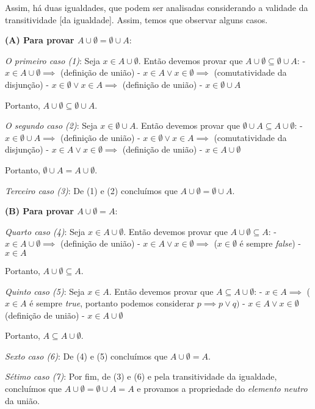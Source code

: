 \documentclass{article}
\begin{document}
Assim, há duas igualdades, que podem ser analisadas considerando a
validade da transitividade {[}da igualdade{]}. Assim, temos que observar
alguns casos.

\textbf{(A) Para provar \(A \cup \emptyset = \emptyset \cup A\)}:

\emph{O primeiro caso (1)}: Seja \(x \in A \cup \emptyset\). Então
devemos provar que \(A \cup \emptyset \subseteq \emptyset \cup A\): -
\(x \in A \cup \emptyset \implies\) (definição de união) -
\(x \in A \lor x \in \emptyset \implies\) (comutatividade da disjunção)
- \(x \in \emptyset \lor x \in A \implies\) (definição de união) -
\(x \in \emptyset \cup A\)

Portanto, \(A \cup \emptyset \subseteq \emptyset \cup A\).

\emph{O segundo caso (2)}: Seja \(x \in \emptyset \cup A\). Então
devemos provar que \(\emptyset \cup A \subseteq A \cup \emptyset\): -
\(x \in \emptyset \cup A \implies\) (definição de união) -
\(x \in \emptyset \lor x \in A \implies\) (comutatividade da disjunção)
- \(x \in A \lor x \in \emptyset \implies\) (definição de união) -
\(x \in A \cup \emptyset\)

Portanto, \(\emptyset \cup A = A \cup \emptyset\).

\emph{Terceiro caso (3)}: De (1) e (2) concluímos que
\(A \cup \emptyset = \emptyset \cup A\).

\textbf{(B) Para provar \(A \cup \emptyset = A\)}:

\emph{Quarto caso (4)}: Seja \(x \in A \cup \emptyset\). Então devemos
provar que \(A \cup \emptyset \subseteq A\): -
\(x \in A \cup \emptyset \implies\) (definição de união) -
\(x \in A \lor x \in \emptyset \implies\) (\(x \in \emptyset\) é sempre
\emph{false}) - \(x \in A\)

Portanto, \(A \cup \emptyset \subseteq A\).

\emph{Quinto caso (5)}: Seja \(x \in A\). Então devemos provar que
\(A \subseteq A \cup \emptyset\): - \(x \in A \implies\) (\(x \in A\) é
sempre \emph{true}, portanto podemos considerar \(p \implies p \lor q)\)
- \(x \in A \lor x \in \emptyset\) (definição de união) -
\(x \in A \cup \emptyset\)

Portanto, \(A \subseteq A \cup \emptyset\).

\emph{Sexto caso (6)}: De (4) e (5) concluímos que
\(A \cup \emptyset = A\).

\emph{Sétimo caso (7)}: Por fim, de (3) e (6) e pela transitividade da
igualdade, concluímos que \(A \cup \emptyset = \emptyset \cup A = A\) e
provamos a propriedade do \emph{elemento neutro} da união.
\end{document}
